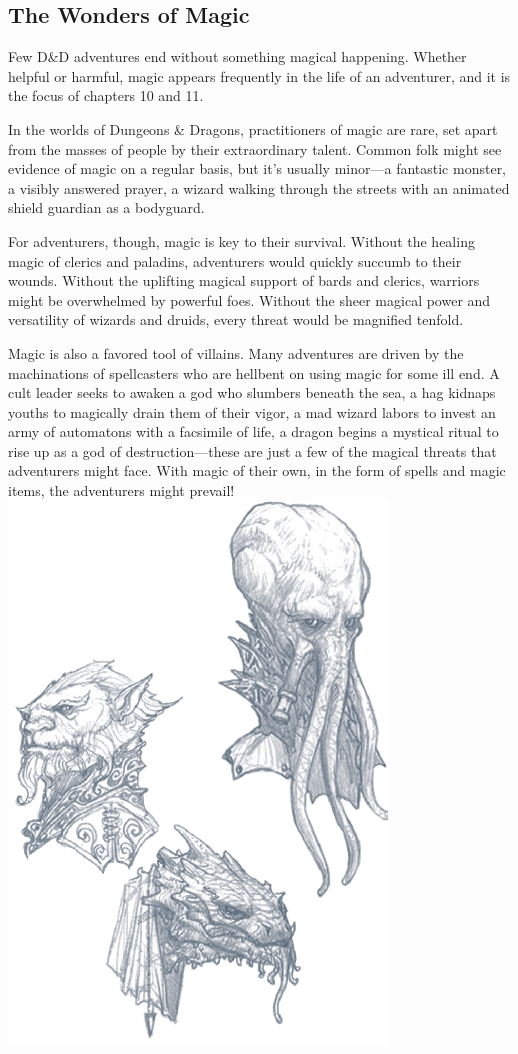 \subsection{The Wonders of Magic}
Few D\&D adventures end without something magical happening. Whether helpful or harmful, magic appears frequently in the life of an adventurer, and it is the focus of chapters 10 and 11.

In the worlds of Dungeons \& Dragons, practitioners of magic are rare, set apart from the masses of people by their extraordinary talent. Common folk might see evidence of magic on a regular basis, but it’s usually minor—a fantastic monster, a visibly answered prayer, a wizard walking through the streets with an animated shield guardian as a bodyguard.

For adventurers, though, magic is key to their survival. Without the healing magic of clerics and paladins, adventurers would quickly succumb to their wounds. Without the uplifting magical support of bards and clerics, warriors might be overwhelmed by powerful foes. Without the sheer magical power and versatility of wizards and druids, every threat would be magnified tenfold.

Magic is also a favored tool of villains. Many adventures are driven by the machinations of spellcasters who are hellbent on using magic for some ill end. A cult leader seeks to awaken a god who slumbers beneath the sea, a hag kidnaps youths to magically drain them of their vigor, a mad wizard labors to invest an army of automatons with a facsimile of life, a dragon begins a mystical ritual to rise up as a god of destruction—these are just a few of the magical threats that adventurers might face. With magic of their own, in the form of spells and magic items, the adventurers might prevail!
\includegraphics{./img/intro01.png}
